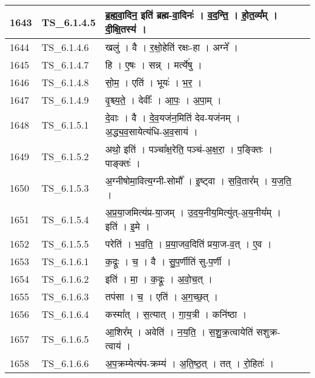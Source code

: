 \documentclass[17pt]{extarticle}
\begin{document}
\begin{longtable}{||p{0.4in}||p{0.9in}||p{4.0in}||p{0.9in}||}
        \hline
            1643 & TS\_6.1.4.5 & ब्र॒ह्म॒वा॒दिन॒ इति॑ ब्रह्म{-}वा॒दिनः॑   ।   व॒द॒न्ति॒   ।   हो॒त॒व्य᳚म्   ।   दी॒क्षि॒तस्य॑   ।    &      \\
        \hline
            1644 & TS\_6.1.4.6 & खलु॑   ।   वै   ।   र॒क्षो॒हेति॑ रक्षः{-}हा   ।   अग्ने᳚   ।    &      \\
        \hline
            1645 & TS\_6.1.4.7 & हि   ।   ए॒षः   ।   सन्न्   ।   मर्त्ये॑षु   ।    &      \\
        \hline
            1646 & TS\_6.1.4.8 & सो॒म॒   ।   एति॑   ।   भूयः॑   ।   भ॒र॒   ।    &      \\
        \hline
            1647 & TS\_6.1.4.9 & वृ॒श्च्य॒ते॒   ।   देवीः᳚   ।   आ॒पः॒   ।   अ॒पा॒म्   ।    &      \\
        \hline
            1648 & TS\_6.1.5.1 & दे॒वाः   ।   वै   ।   दे॒व॒यज॑न॒मिति॑ देव{-}यज॑नम्   ।   अ॒द्ध्य॒व॒सायेत्य॑धि{-}अ॒व॒साय॑   ।    &      \\
        \hline
            1649 & TS\_6.1.5.2 & अथो॒ इति॑   ।   पञ्चा᳚क्ष॒रेति॒ पञ्च॑{-}अ॒क्ष॒रा॒   ।   प॒ङ्क्तिः   ।   पाङ्क्तः॑   ।    &      \\
        \hline
            1650 & TS\_6.1.5.3 & अ॒ग्नीषोमा॒वित्य॒ग्नी{-}सोमौ᳚   ।   इ॒ष्ट्वा   ।   स॒वि॒तार᳚म्   ।   य॒ज॒ति॒   ।    &      \\
        \hline
            1651 & TS\_6.1.5.4 & अ॒प्र॒या॒जमित्य॑प्र{-}या॒जम्   ।   उ॒द॒य॒नीय॒मित्यु॑त्{-}अ॒य॒नीय᳚म्   ।   इति॑   ।   इ॒मे   ।    &      \\
        \hline
            1652 & TS\_6.1.5.5 & परेति॑   ।   भ॒व॒ति॒   ।   प्र॒या॒जव॒दिति॑ प्रया॒ज{-}व॒त्   ।   ए॒व   ।    &      \\
        \hline
            1653 & TS\_6.1.6.1 & क॒द्रूः   ।   च॒   ।   वै   ।   सु॒प॒र्णीति॑ सु{-}प॒र्णी   ।    &      \\
        \hline
            1654 & TS\_6.1.6.2 & इति॑   ।   मा॒   ।   क॒द्रूः   ।   अ॒वो॒च॒त्   ।    &      \\
        \hline
            1655 & TS\_6.1.6.3 & तप॑सा   ।   च॒   ।   एति॑   ।   अ॒ग॒च्छ॒त्   ।    &      \\
        \hline
            1656 & TS\_6.1.6.4 & कस्मा᳚त्   ।   स॒त्यात्   ।   गा॒य॒त्री   ।   कनि॑ष्ठा   ।    &      \\
        \hline
            1657 & TS\_6.1.6.5 & आ॒शिर᳚म्   ।   अवेति॑   ।   न॒य॒ति॒   ।   स॒शु॒क्र॒त्वायेति॑ सशुक्र{-}त्वाय॑   ।    &      \\
        \hline
            1658 & TS\_6.1.6.6 & अ॒प॒क्रम्येत्य॑प{-}क्रम्य॑   ।   अ॒ति॒ष्ठ॒त्   ।   तत्   ।   रो॒हितः॑   ।    &      \\

\end{longtable}
\end{document}
